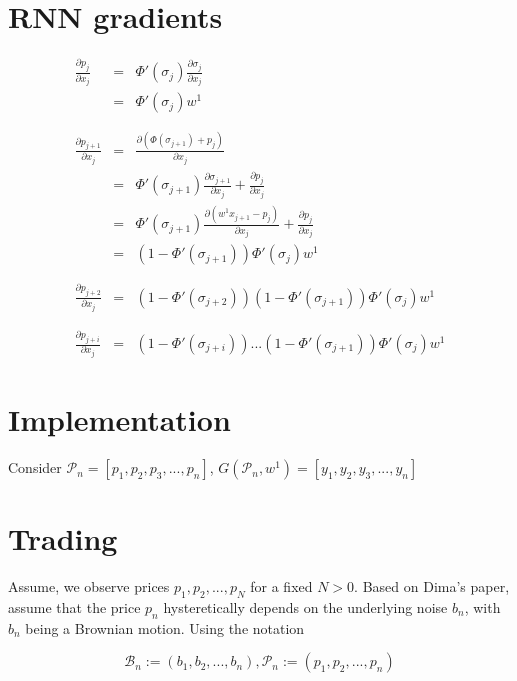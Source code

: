 \documentclass[11pt]{article}
\begin{document}
\section{RNN gradients}
\label{sec:orgf03c4d2}
\begin{eqnarray}
\frac{\partial p_j}{\partial x_j} &=& \Phi'(\sigma_j) \frac{\partial \sigma_j}{\partial x_j} \\
&=& \Phi'(\sigma_j) w^{1} \\
\\
\\
\frac{\partial p_{j+1}}{\partial x_j} &=& \frac{\partial (\Phi(\sigma_{j+1}) + p_j)}{\partial x_j} \\
&=& \Phi'(\sigma_{j+1}) \frac{\partial \sigma_{j+1}}{\partial x_j} + \frac{\partial p_j}{\partial x_j} \\
&=& \Phi'(\sigma_{j+1}) \frac{\partial (w^{1} x_{j+1} - p_{j})}{\partial x_j} + \frac{\partial p_j}{\partial x_j} \\
&=& (1-\Phi'(\sigma_{j+1})) \Phi'(\sigma_j) w^{1} \\
\\
\\
\frac{\partial p_{j+2}}{\partial x_j} &=&  (1-\Phi'(\sigma_{j+2})) (1-\Phi'(\sigma_{j+1})) \Phi'(\sigma_j) w^{1} \\
\\
\\
\frac{\partial p_{j+i}}{\partial x_j} &=&  (1-\Phi'(\sigma_{j+i})) ... (1-\Phi'(\sigma_{j+1})) \Phi'(\sigma_j) w^{1}
\end{eqnarray}

\section{Implementation}
\label{sec:orgd74a973}

Consider \(\mathcal{P}_{n} = [p_{1}, p_{2}, p_{3}, ..., p_{n}]\), \(G(\mathcal{P}_{n}, w^{1}) = [y_{1}, y_{2}, y_{3}, ..., y_{n}]\)

\section{Trading}
\label{sec:orgcc44e28}
Assume, we observe prices \(p_1, p_2, ..., p_N\) for a fixed \(N > 0\). Based on Dima's paper,
assume that the price \(p_{n}\) hysteretically depends on the underlying noise \(b_n\), with \(b_n\) being a
Brownian motion. Using the notation

\[\mathcal{B}_n := (b_1, b_2, ..., b_n), \mathcal{P}_n := (p_1, p_2, ..., p_n)\]
\end{document}
